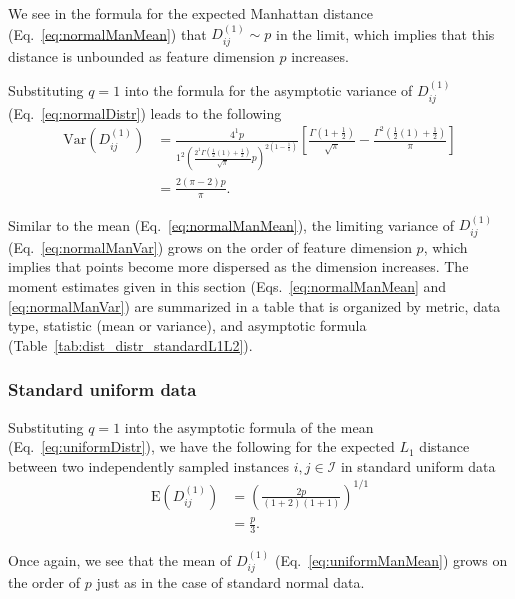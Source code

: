 \documentclass[aoas]{imsart}
\begin{document}
We see in the formula for the expected Manhattan distance (Eq.~\ref{eq:normalManMean}) that $D^{(1)}_{ij} \sim p$ in the limit, which implies that this distance is unbounded as feature dimension $p$ increases.

Substituting $q=1$ into the formula for the asymptotic variance of $D^{(1)}_{ij}$ (Eq.~\ref{eq:normalDistr}) leads to the following
%
\begin{equation}\label{eq:normalManVar}
\begin{aligned}
\text{Var}\left(D^{(1)}_{ij}\right) &= \frac{4^1p}{1^2\left(\frac{2^1\Gamma\left(\frac{1}{2}(1) + \frac{1}{2}\right)}{\sqrt{\pi}}p\right)^{2\left(1 - \frac{1}{1}\right)}}\left[\frac{\Gamma\left(1 + \frac{1}{2}\right)}{\sqrt{\pi}} - \frac{\Gamma^2\left(\frac{1}{2}(1) + \frac{1}{2}\right)}{\pi}\right] \\
&= \frac{2(\pi - 2)p}{\pi}.
\end{aligned}
\end{equation}

Similar to the mean (Eq.~\ref{eq:normalManMean}), the limiting variance of $D^{(1)}_{ij}$ (Eq.~\ref{eq:normalManVar}) grows on the order of feature dimension $p$, which implies that points become more dispersed as the dimension increases. The moment estimates given in this section (Eqs.~\ref{eq:normalManMean} and \ref{eq:normalManVar}) are summarized in a table that is organized by metric, data type, statistic (mean or variance), and asymptotic formula (Table~\ref{tab:dist_distr_standardL1L2}).

\subsubsection{Standard uniform data}

Substituting $q=1$ into the asymptotic formula of the mean (Eq.~\ref{eq:uniformDistr}), we have the following for the expected $L_1$ distance between two independently sampled instances $i,j \in \mathcal{I}$ in standard uniform data
%
\begin{equation}\label{eq:uniformManMean}
\begin{aligned}
\text{E}\left(D^{(1)}_{ij}\right) &= \left(\frac{2p}{(1+2)(1+1)}\right)^{1/1} \\
&= \frac{p}{3}.
\end{aligned}
\end{equation}

Once again, we see that the mean of $D^{(1)}_{ij}$ (Eq.~\ref{eq:uniformManMean}) grows on the order of $p$ just as in the case of standard normal data.
\end{document}
